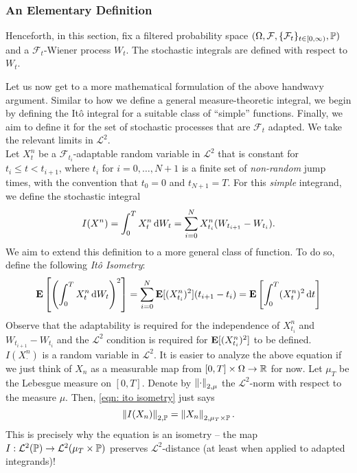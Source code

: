 \subsubsection{An Elementary Definition}

Henceforth, in this section, fix a filtered probability space $(\Omega,\mathcal{F},\{\mathcal{F}_t\}_{t\in[0,\infty)},\mathbb{P})$ and a $\mathcal{F}_t$-Wiener process $W_t$. The stochastic integrals are defined with respect to $W_t$.

Let us now get to a more mathematical formulation of the above handwavy argument. Similar to how we define a general measure-theoretic integral, we begin by defining the It\^{o} integral for a suitable class of ``simple'' functions. Finally, we aim to define it for the set of stochastic processes that are $\mathcal{F}_t$ adapted. We take the relevant limits in $\mathcal{L}^2$.\\

Let $X_t^n$ be a $\mathcal{F}_{t_i}$-adaptable random variable in $\mathcal{L}^2$ that is constant for $t_i \leq t < t_{i+1}$, where $t_i$ for $i=0,\ldots,N+1$ is a finite set of \textit{non-random} jump times, with the convention that $t_0 = 0$ and $t_{N+1} = T$. For this \textit{simple} integrand, we define the stochastic integral
\[ I(X^n) = \int_0^T X_t^n \operatorname{d}\!{W_t} = \sum_{i=0}^N X_{t_i}^n (W_{t_{i+1}} - W_{t_i}). \]
We aim to extend this definition to a more general class of function. To do so, define the following \textit{It\^{o} Isometry}:
\begin{equation}
	\label{eqn: ito isometry}
	\textbf{E}\left[\left(\int_0^T X_t^n \operatorname{d}\!{W}_t\right)^2\right] = \sum_{i=0}^N \textbf{E}[(X_{t_i}^n)^2] (t_{i+1} - t_i) = \textbf{E}\left[\int_0^T (X_t^n)^2 \operatorname{d}\!{t} \right]
\end{equation}
Observe that the adaptability is required for the independence of $X_{t_i}^n$ and $W_{t_{i+1}} - W_{t_i}$ and the $\mathcal{L}^2$ condition is required for $\textbf{E}[(X_{t_i}^n)^2]$ to be defined.\\
$I(X^n_\cdot)$ is a random variable in $\mathcal{L}^2$. It is easier to analyze the above equation if we just think of $X_n$ as a measurable map from $[0,T]\times\Omega\to\mathbb{R}$ for now. Let $\mu_T$ be the Lebesgue measure on $[0,T]$. Denote by $\left\lVert\cdot\right\rVert_{2,\mu}$ the $\mathcal{L}^2$-norm with respect to the measure $\mu$. Then, \eqref{eqn: ito isometry} just says
\begin{equation}
	\label{eqn: ito isometry 2}
	\left\lVert I(X_n)\right\rVert_{2,\mathbb{P}} = \left\lVert X_n\right\rVert_{2,\mu_T\times\mathbb{P}}.
\end{equation}
This is precisely why the equation is an isometry -- the map $I : \mathcal{L}^2(\mathbb{P}) \to \mathcal{L}^2(\mu_T\times\mathbb{P})$ preserves $\mathcal{L}^2$-distance (at least when applied to adapted integrands)!\\

